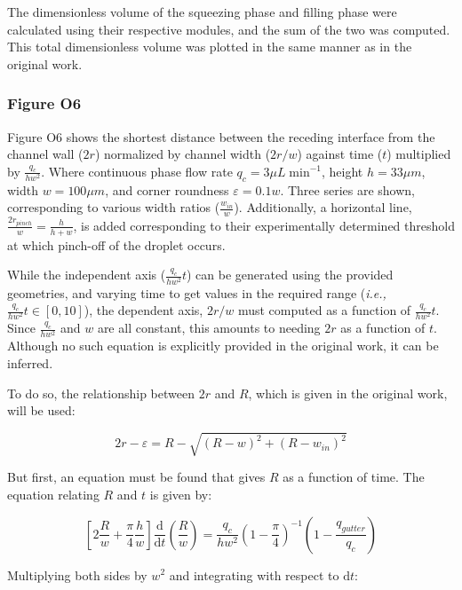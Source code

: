 The dimensionless volume of the squeezing phase and filling phase were calculated using their
respective modules, and the sum of the two was computed. This total dimensionless volume was plotted
in the same manner as in the original work.

\subsubsection{Figure O6}

Figure O6 shows the shortest distance between the receding interface from the channel wall ($2r$) normalized
by channel width ($2r/w$) against time ($t$) multiplied by $\frac{q_c}{hw^2}$. Where continuous phase
flow rate $q_c = 3{\mu}L\;\mathrm{min}^{-1}$, height $h=33{\mu}m$, width $w=100{\mu}m$, and corner roundness
$\varepsilon=0.1w$. Three series are shown, corresponding to various width ratios ($\frac{w_{in}}{w}$).
Additionally, a horizontal line, $\frac{2r_{pinch}}{w}=\frac{h}{h+w}$, is added corresponding to
their experimentally determined threshold at which pinch-off of the droplet occurs.

While the independent axis ($\frac{q_c}{hw^2}t$) can be generated using the provided geometries, and varying
time to get values in the required range (\emph{i.e.,} $\frac{q_c}{hw^2}t \in [0,10]$), the dependent axis,
$2r/w$ must computed as a function of $\frac{q_c}{hw^2}t$. Since $\frac{q_c}{hw^2}$ and $w$ are all constant,
this amounts to needing $2r$ as a function of $t$. Although no such equation
is explicitly provided in the original work, it can be inferred.

To do so, the relationship between $2r$ and $R$, which is given in the original work, will be used:

\begin{equation}
  2r - \varepsilon = R - \sqrt{\left(R - w\right)^2 + \left(R - w_{in}\right)^2}
\end{equation}

\noindent But first, an equation must be found that gives $R$ as a function of time. The equation
relating $R$ and $t$ is given by:

\begin{equation}
  \left[2\frac{R}{w} + \frac{\pi}{4}\frac{h}{w}\right]
  \frac{\mathrm{d}}{\mathrm{d}t}\left(\frac{R}{w}\right) = 
  \frac{q_c}{hw^2} \left(1-\frac{\pi}{4}\right)^{-1}
  \left(1-\frac{q_{gutter}}{q_c}\right)
\end{equation}

\noindent Multiplying both sides by $w^2$ and integrating with respect to $\mathrm{d}t$:

